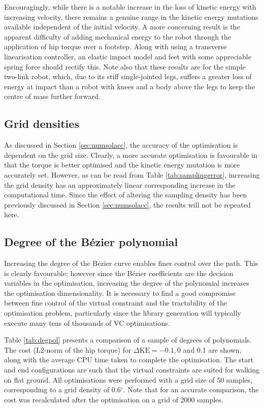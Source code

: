 Encouragingly, while there is a notable increase in the loss of kinetic energy with increasing velocity, there remains a genuine range in the kinetic energy mutations available independent of the initial velocity. A more concerning result is the apparent difficulty of adding mechanical energy to the robot through the application of hip torque over a footstep. Along with using a transverse linearisation controller, an elastic impact model and feet with some appreciable spring force should rectify this. Note also that these results are for the simple two-link robot, which, due to its stiff single-jointed legs, suffers a greater loss of energy at impact than a robot with knees and a body above the legs to keep the centre of mass further forward.

\subsection{Grid densities}
As discussed in Section \ref{sec:numsolacc}, the accuracy of the optimisation is dependent on the grid size. Clearly, a more accurate optimisation is favourable in that the torque is better optimised and the kinetic energy mutation is more accurately set. However, as can be read from Table \ref{tab:samplingerror}, increasing the grid density has an approximately linear corresponding increase in the computational time. Since the effect of altering the sampling density has been previously discussed in Section \ref{sec:numsolacc}, the results will not be repeated here.

\subsection{Degree of the Bézier polynomial}
Increasing the degree of the Bézier curve enables finer control over the path. This is clearly favourable; however since the Bézier coefficients are the decision variables in the optimisation, increasing the degree of the polynomial increases the optimisation dimensionality. It is necessary to find a good compromise between fine control of the virtual constraint and the tractability of the optimisation problem, particularly since the library generation will typically execute many tens of thousands of VC optimisations.

Table \ref{tab:degpol} presents a comparison of a sample of degrees of polynomials. The cost (L2-norm of the hip torque) for $\Delta\mathrm{KE}=-0.1,0$ and 0.1 are shown, along with the average CPU time taken to complete the optimisation. The start and end configurations are such that the virtual constraints are suited for walking on flat ground. All optimisations were performed with a grid size of 50 samples, corresponding to a grid density of 0.6$^\circ$. Note that for an accurate comparison, the cost was recalculated after the optimisation on a grid of 2000 samples.

